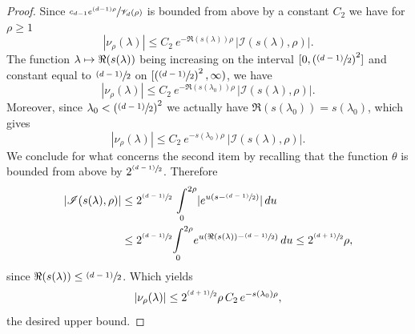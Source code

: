 \documentclass[10pt]{amsart}
\let\mathcal\mathscr
\newcommand{\psfrac}[2]{\sfrac{(#1)}{#2}}
\def\mto{\mathchoice{\longmapsto}{\mapsto}{\mapsto}{\mapsto}}
\theoremstyle{plain}
\theoremstyle{definition}
\newcommand{\inte}[1]{\underset{#1}{\int}}
\begin{document}
\begin{proof}
Since $\sfrac{c_{d-1} e^{(d-1)\rho}}{\mathcal{V}_d(\rho)}$ is bounded from above by a constant $C_2$ we have for $\rho \ge 1$
\[
| \nu_{\rho}(\lambda)| \le C_2 \ e^{ - \Re(s(\lambda)) \rho } \, | \mathcal{I}(s(\lambda),\rho) |.
\]
The function $ \lambda \mto \Re(s(\lambda))$ being increasing on the interval $[0,\left(\psfrac{d-1}{2}\right)^2]$ and constant equal to $\psfrac{d-1}{2}$ on $[\left(\psfrac{d-1}{2}\right)^2,\infty)$, we have
\[
| \nu_{\rho}(\lambda)| \le C_2 \ e^{ - \Re(s(\lambda_0)) \rho } \, | \mathcal{I}(s(\lambda),\rho) |.
\]
Moreover, since $\lambda_0 < \left(\psfrac{d-1}{2}\right)^2$ we actually have $\Re(s(\lambda_0)) = s(\lambda_0)$, which gives
\[
|\nu_{\rho}(\lambda)| \le C_2 \ e^{ - s(\lambda_0) \rho } \ | \mathcal{I}(s(\lambda),\rho) |.
\]
We conclude for what concerns the second item by recalling that the function $\theta$ is bounded from above by $2^{ \psfrac{d-1}{2}}$. Therefore
\begin{align*}
| \mathcal{I}(s(\lambda),\rho) | & \le 2^{ \psfrac{d-1}{2}} \ \inte{0}^{2\rho} | e^{u \left(s - \psfrac{d-1}{2} \right)} | \,du \\
& \le 2^{ \psfrac{d-1}{2}} \inte{0}^{2\rho} e^{u \left(\Re(s(\lambda)) - \psfrac{d-1}{2} \right)} \,du \le 2^{ \psfrac{d+1}{2}} \rho,
\end{align*}
since $\Re(s(\lambda)) \le \psfrac{d-1}{2}$. Which yields
\[
|\nu_{\rho}(\lambda)| \le 2^{ \psfrac{d+1}{2}} \rho \, C_2 \, e^{ - s(\lambda_0) \rho},
\]
the desired upper bound.


\end{proof}
\end{document}
